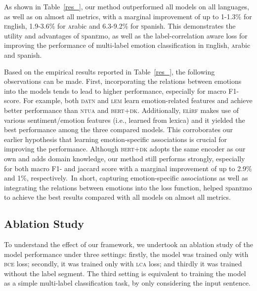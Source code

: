 \documentclass[11pt,a4paper]{article}
\begin{document}
As shown in Table~\ref{res_}, our method outperformed all models on all languages, as well as on almost all metrics, with a marginal improvement of up to 1-1.3\% for \textsc{e}nglish, 1.9-3.6\% for \textsc{a}rabic and 6.3-9.2\% for \textsc{s}panish. This demonstrates the utility and advantages of \textsc{s}pan\textsc{e}mo, as well as the label-correlation aware loss for improving the performance of multi-label emotion classification in \textsc{e}nglish, \textsc{a}rabic and \textsc{s}panish.

Based on the empirical results reported in Table~\ref{res_}, the following observations can be made. First, incorporating the relations between emotions into the models tends to lead to higher performance, especially for macro F1-score. For example, both \textsc{datn} and \textsc{lem} learn emotion-related features and achieve better performance than \textsc{ntua} and \textsc{bert}+\textsc{dk}. Additionally, \textsc{el}i\textsc{rf} makes use of various sentiment/emotion features (i.e., learned from lexica) and it yielded the best performance among the three compared models. This corroborates our earlier hypothesis that learning emotion-specific associations is crucial for improving the performance. Although \textsc{bert}+\textsc{dk} adopts the same encoder as our own and adds domain knowledge, our method still performs strongly, especially for both macro F1- and jaccard score with a marginal improvement of up to 2.9\% and 1\%, respectively.~In short, capturing emotion-specific associations as well as integrating the relations between emotions into the loss function, helped \textsc{s}pan\textsc{e}mo to achieve the best results compared with all models on almost all metrics.  


\subsection{Ablation Study}\label{ablation}



To understand the effect of our framework, we undertook an ablation study of the model performance under three settings: firstly, the model was trained only with \textsc{bce} loss; secondly, it was trained only with \textsc{lca} loss; and thirdly it was trained without the label segment. The third setting is equivalent to training the model as a simple multi-label classification task, by only considering the input sentence.  
\end{document}
